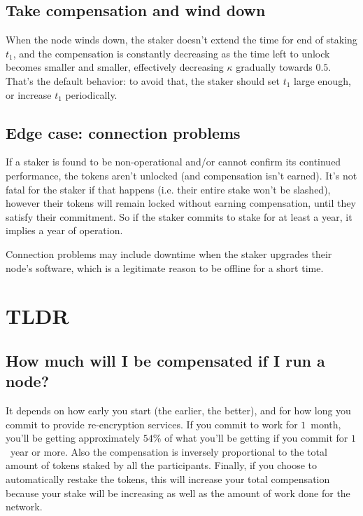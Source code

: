 \documentclass[longbibliography,nofootinbib,twocolumn]{revtex4-1}
\begin{document}
\subsection{Take compensation and wind down}

When the node winds down, the staker doesn't extend the time for end of staking $t_1$,
and the compensation is constantly decreasing as the time left to unlock becomes smaller and smaller,
effectively decreasing $\kappa$ gradually towards $0.5$.
That's the default behavior: to avoid that, the staker should set $t_1$ large enough, or increase $t_1$ periodically.

\subsection{Edge case: connection problems}

If a staker is found to be non-operational and/or cannot confirm its continued performance, the tokens aren't unlocked (and compensation isn't earned).
It's not fatal for the staker if that happens (i.e. their entire stake won't be slashed), however their tokens will remain locked without earning compensation,
until they satisfy their commitment.
So if the staker commits to stake for at least a year, it implies a year of operation.

Connection problems may include downtime when the staker upgrades their node's software, which is a legitimate reason to be offline for a short time.

\section{TLDR}

\subsection{How much will I be compensated if I run a node?}
It depends on how early you start (the earlier, the better), and for how long you commit to provide re-encryption services.
If you commit to work for $1$~month, you'll be getting approximately $54\%$ of what you'll be getting if you commit for $1$~year or more.
Also the compensation is inversely proportional to the total amount of tokens staked by all the participants.
Finally, if you choose to automatically restake the tokens, this will increase your total compensation because your stake will be increasing as
well as the amount of work done for the network.
\end{document}
